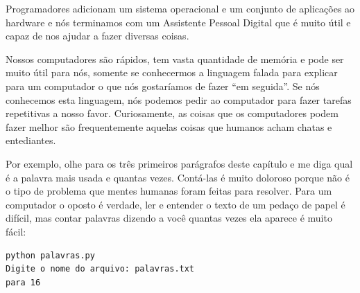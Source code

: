 Programadores adicionam um sistema operacional e um conjunto de
aplicações ao hardware e nós terminamos com um Assistente 
Pessoal Digital que é muito útil e capaz de nos ajudar a fazer
diversas coisas.

Nossos computadores são rápidos, tem vasta quantidade de memória
e pode ser muito útil para nós, somente se conhecermos a linguagem
falada para explicar para um computador o que nós gostaríamos
de fazer ``em seguida''. Se nós conhecemos esta linguagem, nós
podemos pedir ao computador para fazer tarefas repetitivas a 
nosso favor. Curiosamente, as coisas que os computadores
podem fazer melhor são frequentemente aquelas coisas que humanos
acham chatas e entediantes.

Por exemplo, olhe para os três primeiros parágrafos deste
capítulo e me diga qual é a palavra mais usada e quantas 
vezes. Contá-las é muito doloroso porque 
não é o tipo de problema que mentes humanas foram feitas para 
resolver. Para um computador o oposto é verdade, ler e entender o texto
de um pedaço de papel é difícil, mas contar palavras dizendo a 
você quantas vezes ela aparece é muito fácil:

\beforeverb
\begin{verbatim}
python palavras.py
Digite o nome do arquivo: palavras.txt
para 16
\end{verbatim}
\afterverb

